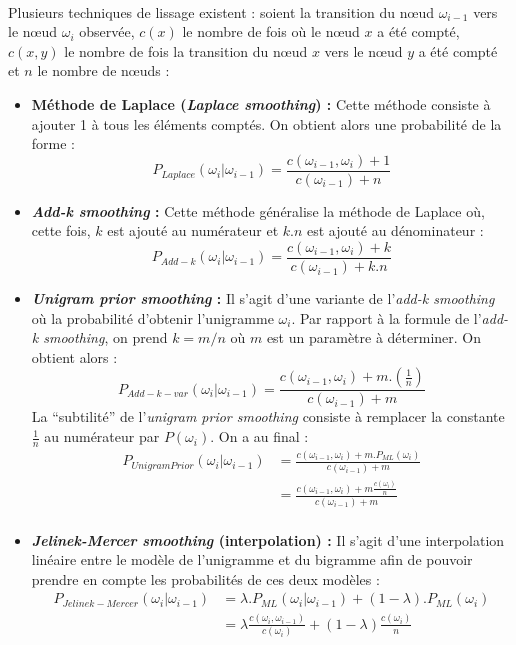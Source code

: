 \documentclass[a4paper,titlepage]{report}
\begin{document}
\paragraph{}
Plusieurs techniques de lissage existent : soient la transition du nœud $\omega_{i-1}$ vers le nœud $\omega_i$ observée, $c(x)$ le nombre de fois où le nœud $x$ a été compté, $c(x,y)$ le nombre de fois la transition du nœud $x$ vers le nœud $y$ a été compté et $n$ le nombre de nœuds : \\
\begin{itemize}
	\item \textbf{Méthode de Laplace (\textit{Laplace smoothing}) :} Cette méthode consiste à ajouter 1 à tous les éléments comptés. On obtient alors une probabilité de la forme : 
	\[
		P_{Laplace} (\omega_i | \omega_{i-1}) = \frac{c(\omega_{i-1}, \omega_i) + 1}{c(\omega_{i-1}) + n}
	\]
	\item \textbf{\textit{Add-k smoothing} :} Cette méthode généralise la méthode de Laplace où, cette fois, $k$ est ajouté au numérateur et $k.n$ est ajouté au dénominateur : 
	\[
		P_{Add-k} (\omega_i | \omega_{i-1}) = \frac{c(\omega_{i-1}, \omega_i) + k}{c(\omega_{i-1}) + k.n}
	\]
	\item \textbf{\textit{Unigram prior smoothing} :} Il s'agit d'une variante de l'\textit{add-k smoothing} où la probabilité d'obtenir l'unigramme $\omega_i$. Par rapport à la formule de l'\textit{add-k smoothing}, on prend $k = m/n$ où $m$ est un paramètre à déterminer. On obtient alors : 
	\[
		P_{Add-k-var} (\omega_i | \omega_{i-1}) = \frac{c(\omega_{i-1}, \omega_i) + m . \left(\frac{1}{n}\right)}{c(\omega_{i-1}) + m}
	\]
	La ``subtilité'' de l'\textit{unigram prior smoothing} consiste à remplacer la constante $\frac{1}{n}$ au numérateur par $P(\omega_i)$. On a au final : 
	\[
	\begin{aligned}
		P_{UnigramPrior} (\omega_i | \omega_{i-1}) 
			&= \frac{c(\omega_{i-1}, \omega_i) + m . P_{ML}(\omega_i)}{c(\omega_{i-1}) + m}\\
			&= \frac{c(\omega_{i-1}, \omega_i) + m \frac{c(\omega_i)}{n}}{c(\omega_{i-1}) + m}\\
	\end{aligned}
	\]
	\item \textbf{\textit{Jelinek-Mercer smoothing} (interpolation) :} Il s'agit d'une interpolation linéaire entre le modèle de l'unigramme et du bigramme afin de pouvoir prendre en compte les probabilités de ces deux modèles : 
	\[
	\begin{aligned}
		P_{Jelinek-Mercer} (\omega_i | \omega_{i-1}) 
			&= \lambda . P_{ML}(\omega_i | \omega_{i-1}) + (1 - \lambda) . P_{ML}(\omega_i)\\
			&= \lambda \frac{c(\omega_i, \omega_{i-1})}{c(\omega_i)} + (1 - \lambda) \frac{c(\omega_i)}{n}
	\end{aligned}
	\]	 
\end{itemize}
\end{document}
